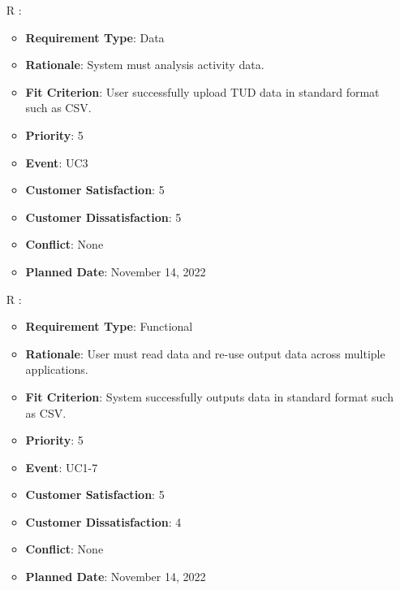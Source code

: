 \documentclass[12pt, titlepage]{article}
\newcounter{reqnum} %
\begin{document}
\begin{itemize}
\item[R\refstepcounter{reqnum}\thereqnum
\label{R_Inputs_1}:] 
\begin{itemize}
    \item \textbf{Requirement Type}: Data
    \item \textbf{Rationale}: System must analysis activity data.
    \item \textbf{Fit Criterion}: User successfully upload TUD data in standard format such as CSV. 
    \item \textbf{Priority}: 5
    \item \textbf{Event}: UC3
    \item \textbf{Customer Satisfaction}: 5
    \item \textbf{Customer Dissatisfaction}: 5
    \item \textbf{Conflict}: None
    \item \textbf{Planned Date}: November 14, 2022
\end{itemize}

\item[R\refstepcounter{reqnum}\thereqnum
\label{R_Output_3}:] 
\begin{itemize}
    \item \textbf{Requirement Type}: Functional
    \item \textbf{Rationale}: User must read data and re-use output data across multiple applications.
    \item \textbf{Fit Criterion}: System successfully outputs data in standard format such as CSV. 
    \item \textbf{Priority}: 5
    \item \textbf{Event}: UC1-7
    \item \textbf{Customer Satisfaction}: 5
    \item \textbf{Customer Dissatisfaction}: 4
    \item \textbf{Conflict}: None
    \item \textbf{Planned Date}: November 14, 2022
\end{itemize}


\end{itemize}
\end{document}
